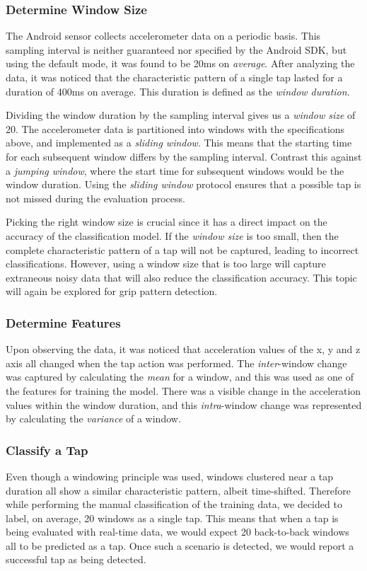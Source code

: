 \subsubsection{Determine Window Size}
The Android sensor collects accelerometer data on a periodic basis. This sampling interval is neither guaranteed nor specified by the Android SDK, but using the default mode, it was found to be 20ms on \textit{average}. After analyzing the data, it was noticed that the characteristic pattern of a single tap lasted for a duration of 400ms on average. This duration is defined as the \textit{window duration}.
\par
Dividing the window duration by the sampling interval gives us a \textit{window size} of 20. The accelerometer data is partitioned into windows with the specifications above, and implemented as a \textit{sliding window}. This means that the starting time for each subsequent window differs by the sampling interval. Contrast this against a \textit{jumping window}, where the start time for subsequent windows would be the window duration. Using the \textit{sliding window} protocol ensures that a possible tap is not missed during the evaluation process.
\par
Picking the right window size is crucial since it has a direct impact on the accuracy of the classification model. If the \textit{window size} is too small, then the complete characteristic pattern of a tap will not be captured, leading to incorrect classifications. However, using a window size that is too large will capture extraneous noisy data that will also reduce the classification accuracy. This topic will again be explored for grip pattern detection.

\subsubsection{Determine Features}
Upon observing the data, it was noticed that acceleration values of the x, y and z axis all changed when the tap action was performed. The \textit{inter}-window change was captured by calculating the \textit{mean} for a window, and this was used as one of the features for training the model. There was a visible change in the acceleration values within the window duration, and this \textit{intra}-window change was represented by calculating the \textit{variance} of a window. 

\subsubsection{Classify a Tap}
Even though a windowing principle was used, windows clustered near a tap duration all show a similar characteristic pattern, albeit time-shifted. Therefore while performing the manual classification of the training data, we decided to label, on average, 20 windows as a single tap. This means that when a tap is being evaluated with real-time data, we would expect 20 back-to-back windows all to be predicted as a tap. Once such a scenario is detected, we would report a successful tap as being detected.

